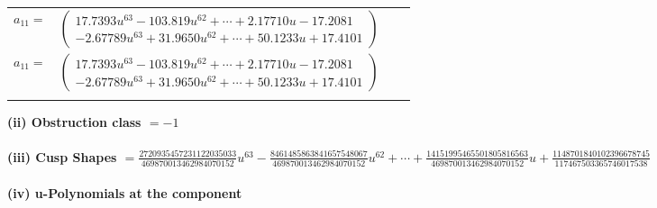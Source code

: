 \documentclass[1p]{elsarticle_modified}
\theoremstyle{definition}
\begin{document}
\begin{tabular}{m{7pt} m{180pt} m{7pt} m{180pt} }
\flushright $a_{11}=$&$\begin{pmatrix}17.7393 u^{63}-103.819 u^{62}+\cdots+2.17710 u-17.2081\\-2.67789 u^{63}+31.9650 u^{62}+\cdots+50.1233 u+17.4101\end{pmatrix}$\\ \flushright $a_{11}=$&$\begin{pmatrix}17.7393 u^{63}-103.819 u^{62}+\cdots+2.17710 u-17.2081\\-2.67789 u^{63}+31.9650 u^{62}+\cdots+50.1233 u+17.4101\end{pmatrix}$\\&\end{tabular}
\flushleft \textbf{(ii) Obstruction class $= -1$}\\~\\
\flushleft \textbf{(iii) Cusp Shapes $= \frac{2720935457231122035033}{469870013462984070152} u^{63}-\frac{8461485863841657548067}{469870013462984070152} u^{62}+\cdots+\frac{14151995465501805816563}{469870013462984070152} u+\frac{1148701840102396678745}{117467503365746017538}$}\\~\\
\newpage\renewcommand{\arraystretch}{1}
\flushleft \textbf{(iv) u-Polynomials at the component}\newline \\
\end{document}

